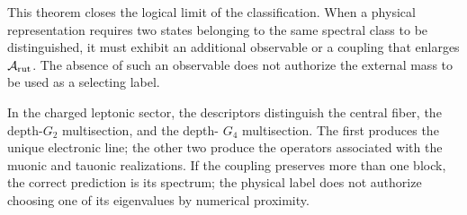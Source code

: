 This theorem closes the logical limit of the classification. When a
physical representation requires two states belonging to the same
spectral class to be distinguished, it must exhibit an additional observable or a coupling that
enlarges \(\mathcal A_{\rm rut}\). The absence of such an observable does not authorize
the external mass to be used as a selecting label.

In the charged leptonic sector, the descriptors distinguish the central fiber,
the depth-\(G_2\) multisection, and the depth-
\(G_4\) multisection. The first produces the unique electronic line; the other two
produce the operators associated with the muonic and tauonic realizations. If
the coupling preserves more than one block, the correct prediction is its
spectrum; the physical label does not authorize choosing one of its eigenvalues by
numerical proximity.


